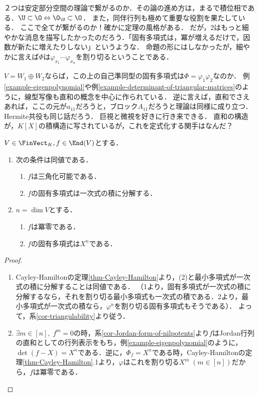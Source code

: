 \documentclass[uplatex, dvipdfmx]{jsreport}
\begin{document}
\begin{remark}
    ２つは安定部分空間の理論で繋がるのか．その論の進め方は，まるで積位相である．$\U\subset\O\Leftrightarrow\O_\U\subset\O$．
    また，同伴行列も極めて重要な役割を果たしている．
    ここで全てが繋がるのか！確かに定理の風格がある．
    だが，2はもっと細やかな消息を描写したかったのだろう．「固有多項式は，冪が増えるだけで，因数が新たに増えたりしない」というような．
    命題の形にはしなかったが，細やかに言えば$\Phi$は$\varphi_{x_1}\cdots\varphi_{x_n}$を割り切るということである．

    $V=W_1\oplus W_2$ならば，この上の自己準同型の固有多項式は$\Phi=\varphi_1\varphi_2$なのか．
    例\ref{example-eigenpolynomial}や例\ref{example-determinant-of-triangular-matrices}のように，線型写像も直和の概念を中心に作られている．
    逆に言えば，直和でさえあれば，ここの元が$a_{11}$だろうと，ブロック$A_{11}$だろうと理論は同様に成り立つ．Hermite共役も同じ話だろう．
    巨視と微視を好きに行き来できる．
    直和の構造が，$K[X]$の積構造に写されているが，これを定式化する関手はなんだ？
\end{remark}

\begin{corollary}[最小多項式の代用]
    $V\in\FinVect_K,f\in\End(V)$とする．
    \begin{enumerate}
        \item 次の条件は同値である．\begin{enumerate}[(1)]
            \item $f$は三角化可能である．
            \item $f$の固有多項式は一次式の積に分解する．
        \end{enumerate}
        \item $n=\dim V$とする．\begin{enumerate}
            \item $f$は冪零である．
            \item $f$の固有多項式は$X^n$である．
        \end{enumerate}
    \end{enumerate}
\end{corollary}
\begin{proof}\mbox{}
    \begin{enumerate}
        \item Cayley-Hamiltonの定理\ref{thm-Cayley-Hamilton}より，(2)と最小多項式が一次式の積に分解することは同値である．
        （1より，固有多項式が一次式の積に分解するなら，それを割り切る最小多項式も一次式の積である．2より，最小多項式が一次式の積なら，$\varphi^n$を割り切る固有多項式もそうである）．
        よって，系\ref{cor-triangulability}より従う．
        \item $\exists m\in[n],\;f^m=0$の時，系\ref{cor-Jordan-form-of-nilpotents}より$f$はJordan行列の直和としての行列表示をもち，例\ref{example-eigenpolynomial}のように，
        $\det(f-X)=X^n$である．逆に，$\Phi_f=X^n$である時，Cayley-Hamiltonの定理\ref{thm-Cayley-Hamilton}.1より，$\varphi$はこれを割り切る$X^m\;(m\in[n])$だから，$f$は冪零である．
    \end{enumerate}
\end{proof}
\end{document}
